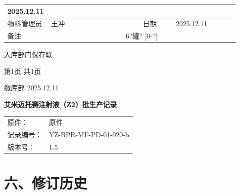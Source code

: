 \documentclass[UTF8,10pt,a4paper,fontset=fandol]{ctexart}
\newcommand{\fieldvalue}[1]{#1}
\newcommand{\handwritten}[1]{#1}
\begin{document}
\begin{tabular}{|p{0.13\linewidth}|p{0.39\linewidth}|p{0.14\linewidth}|p{0.27\linewidth}|}
\fieldvalue{\handwritten{2025.12.11}} \\
\hline
物料管理员 &
\fieldvalue{\handwritten{王冲}} &
日期 &
\fieldvalue{\handwritten{2025.12.11}} \\
\hline
备注 &
\multicolumn{3}{c|}{
\fieldvalue{\handwritten{6?罐? [0-?]}}
} \\
\hline
\end{tabular}

\vspace{0.3em}

\hfill 入库部门保存联

\begin{center}
第1页 共1页
\end{center}

\handwritten{缴库部 2025.12.11}

\newpage


\begin{center}
\textbf{艾米迈托赛注射液（Z2）批生产记录}
\end{center}

\noindent
\begin{tabular}{@{}ll@{}}
原件：&
\fieldvalue{原件}
\\
记录编号：&
\fieldvalue{YZ-BPR-MF-PD-01-020-b}
\\
版本号：&
\fieldvalue{1.5}
\end{tabular}

\section*{六、修订历史}
\end{document}
